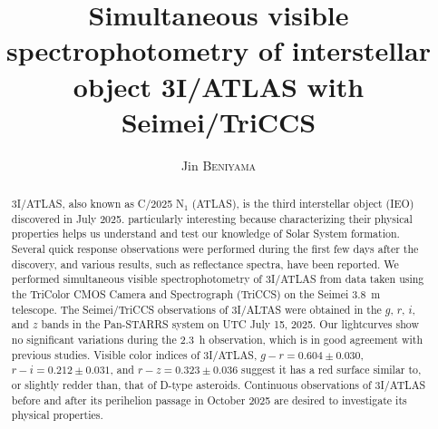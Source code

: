 \documentclass[]{pasj02}
\newcommand\gr{$g-r=0.604\pm0.030$\xspace}
\newcommand\ri{$r-i=0.212\pm0.031$\xspace}
\newcommand\rz{$r-z=0.323\pm0.036$\xspace}
\begin{document}
 

\title{Simultaneous visible spectrophotometry of interstellar object 3I/ATLAS with Seimei/TriCCS}

\author{
Jin \textsc{Beniyama}\altemailmark{}  
}


\maketitle

\begin{abstract}
3I/ATLAS, also known as C/2025 N$_1$ (ATLAS), is the third interstellar object (IEO) discovered in July 2025.
particularly interesting because characterizing their physical properties helps us understand and test our knowledge of Solar System formation.
Several quick response observations were performed during the first few days after the discovery, and various results, such as reflectance spectra, have been reported.
We performed simultaneous visible spectrophotometry of 3I/ATLAS from data taken using the TriColor CMOS Camera and Spectrograph (TriCCS) on the Seimei 3.8~m telescope.
The Seimei/TriCCS observations of 3I/ALTAS were obtained in the $g$, $r$, $i$, and $z$ bands in the Pan-STARRS system on UTC July 15, 2025.
Our lightcurves show no significant variations during the 2.3~h observation, which is in good agreement with previous studies.
Visible color indices of 3I/ATLAS, \gr, \ri, and \rz suggest it has a red surface similar to, or slightly redder than, that of D-type asteroids.
Continuous observations of 3I/ATLAS before and after its perihelion passage in October 2025 are desired to investigate its physical properties.
\end{abstract}

\pagewiselinenumbers 
\clearpage
\end{document}
